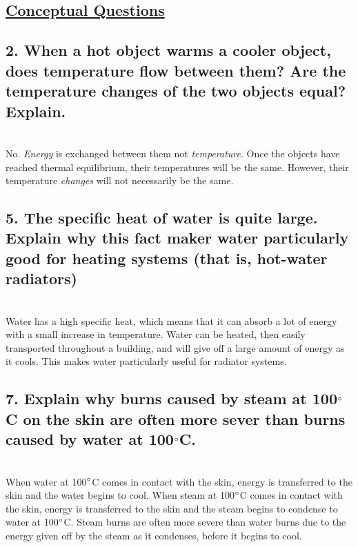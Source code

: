 \documentclass{article}
\title{
    \vspace{2in}
    \textmd{\textbf{\hmwkTitle}}\\
    \vspace{0.5in}
    \textmd{\textbf{\hmwkClass}}\\
    \vspace{4in}
}
\author{\hmwkAuthorName}
\date{}
\begin{document}
\maketitle
\begin{center}
    \section*{\textbf{\underline {Conceptual Questions}}}
\end{center}

\subsection*{2. When a hot object warms a cooler object, does temperature flow between them? Are the temperature changes of the two objects equal? Explain.} \\

\large{No. \textit{Energy} is exchanged between them not \textit {temperature}. Once the objects have reached thermal equilibrium, their temperatures will be the same. However, their temperature \textit{changes} will not necessarily be the same.}

\subsection*{5. The specific heat of water is quite large. Explain why this fact maker water particularly good for heating systems (that is, hot-water radiators)} \\

\large{Water has a high specific heat, which means that it can absorb a lot of energy with a small increase in temperature. Water can be heated, then easily transported throughout a building, and will give off a large amount of energy as it cools. This makes water particularly useful for radiator systems.}

\subsection*{7. Explain why burns caused by steam at 100$\degree$C on the skin are often more sever than burns caused by water at 100$\degree$C.} \\

When water at 100$\degree$C comes in contact with the skin, energy is transferred to the skin and the water begins to cool. When steam at 100$\degree$C comes in contact with the skin, energy is transferred to the skin and the steam begins to condense to water at 100$\degree$C. Steam burns are often more severe than water burns due to the energy given off by the steam as it condenses, before it begins to cool.
\end{document}
